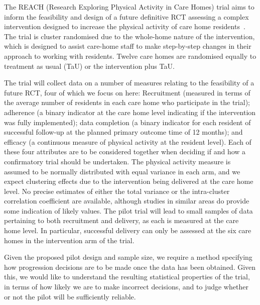 \documentclass{article} %
\begin{document}
The REACH (Research Exploring Physical Activity in Care Homes) trial aims to inform the feasibility and design of a future definitive RCT assessing a complex intervention designed to increase the physical activity of care home residents~\cite{Forster2017}. The trial is cluster randomised due to the whole-home nature of the intervention, which is designed to assist care-home staff to make step-by-step changes in their approach to working with residents. Twelve care homes are randomised equally to treatment as usual (TaU) or the intervention plus TaU.

The trial will collect data on a number of measures relating to the feasibility of a future RCT, four of which we focus on here: Recruitment (measured in terms of the average number of residents in each care home who participate in the trial); adherence (a binary indicator at the care home level indicating if the intervention was fully implemented); data completion (a binary indicator for each resident of successful follow-up at the planned primary outcome time of 12 months); and efficacy (a continuous measure of physical activity at the resident level). Each of these four attributes are to be considered together when deciding if and how a confirmatory trial should be undertaken. The physical activity measure is assumed to be normally distributed with equal variance in each arm, and we expect clustering effects due to the intervention being delivered at the care home level. No precise estimates of either the total variance or the intra-cluster correlation coefficient are available, although studies in similar areas do provide some indication of likely values. The pilot trial will lead to small samples of data pertaining to both recruitment and delivery, as each is measured at the care home level. In particular, successful delivery can only be assessed at the six care homes in the intervention arm of the trial. 

Given the proposed pilot design and sample size, we require a method specifying how progression decisions are to be made once the data has been obtained. Given this, we would like to understand the resulting statistical properties of the trial, in terms of how likely we are to make incorrect decisions, and to judge whether or not the pilot will be sufficiently reliable.

\end{document}
